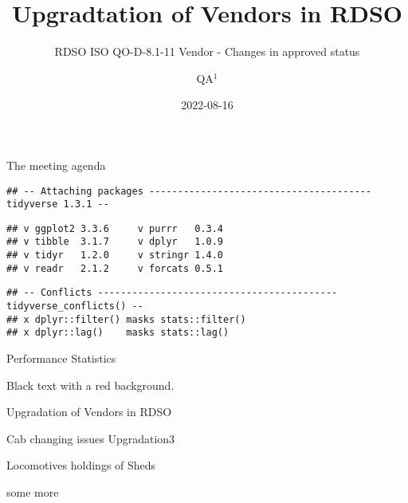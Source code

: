 \documentclass[
  ignorenonframetext,
]{beamer}
\title{Upgradtation of Vendors in RDSO}
\subtitle{RDSO ISO QO-D-8.1-11 Vendor - Changes in approved status}
\author{QA\(^1\)}
\date{2022-08-16}
\institute{\(^1\)QA(Mech)}
\begin{document}
\frame{\titlepage}

\begin{frame}[allowframebreaks]
  \tableofcontents[hideallsubsections]
\end{frame}
\begin{frame}
\end{frame}

\begin{frame}[fragile]{The meeting agenda}
\protect\hypertarget{the-meeting-agenda}{}
\begin{verbatim}
## -- Attaching packages --------------------------------------- tidyverse 1.3.1 --
\end{verbatim}

\begin{verbatim}
## v ggplot2 3.3.6     v purrr   0.3.4
## v tibble  3.1.7     v dplyr   1.0.9
## v tidyr   1.2.0     v stringr 1.4.0
## v readr   2.1.2     v forcats 0.5.1
\end{verbatim}

\begin{verbatim}
## -- Conflicts ------------------------------------------ tidyverse_conflicts() --
## x dplyr::filter() masks stats::filter()
## x dplyr::lag()    masks stats::lag()
\end{verbatim}
\end{frame}

\begin{frame}{Performance Statistics}
\protect\hypertarget{performance-statistics}{}
\begin{shaded}
Black text with a red background.
\end{shaded}


\begin{block}{Upgradation of Vendors in RDSO}
\protect\hypertarget{upgradation-of-vendors-in-rdso}{}
\begin{block}{Cab changing issues}
\protect\hypertarget{cab-changing-issues}{}
Upgradation3
\end{block}
\end{block}
\end{frame}

\begin{frame}{Locomotives holdings of Sheds}
\protect\hypertarget{locomotives-holdings-of-sheds}{}
\end{frame}

\begin{frame}{some more}
\protect\hypertarget{some-more}{}
\end{frame}
\end{document}
